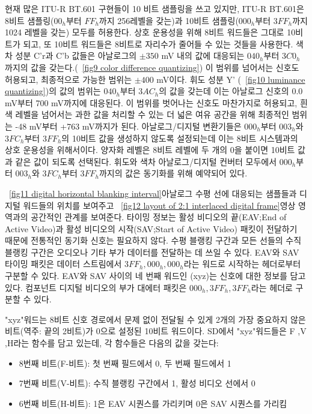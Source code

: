 현재 많은 ITU-R BT.601 구현들이 10 비트 샘플링을 쓰고 있지만, ITU-R BT.601은 8비트 샘플링($00_h$부터 $FF_h$까지 256레벨을 갖는)과 10비트 샘플링($000_h$부터 $3FF_h$까지 1024 레벨을 갖는) 모두를 허용한다.
상호 운용성을 위해 8비트 워드들은 그대로 10비트가 되고, 또 10비트 워드들은 8비트로 자리수가 줄어들 수 있는 것들을 사용한다. 색차 성분 C'r과 C'b 값들은 아날로그의 $\pm 350$ mV 내의 값에 대응되는 $040_h$부터 $3C0_h$까지의 값을 갖는다.(\figurename~\ref{fig9 color difference quantizing})
이 범위를 넘어서는 신호도 허용되고, 최종적으로 가능한 범위는 $\pm 400$ mV이다. 휘도 성분 Y' (\figurename~\ref{fig10 luminance quantizing})의 값의 범위는 $040_h$부터 $3AC_h$의 값을 갖는데 이는 아날로그 신호의 0.0 mV부터 700 mV까지에 대응된다.
이 범위를 벗어나는 신호도 마찬가지로 허용되고, 흰색 레벨을 넘어서는 과한 값을 처리할 수 있는 더 넓은 여유 공간을 위해 최종적인 범위는 -48 mV부터 +763 mV까지가 된다.
아날로그/디지털 변환기들은 $000_h$부터 $003_h$와 $3FC_h$부터 $3FF_h$의 10비트 값을 생성하지 않도록 설정되는데 이는 8비트 시스템과의 상호 운용성을 위해서이다.
양자화 레벨은 8비트 레벨에 두 개의 0을 붙이면 10비트 값과 같은 값이 되도록 선택된다. 휘도와 색차 아날로그/디지털 컨버터 모두에서 $000_h$부터 $003_h$와 $3FC_h$부터 $3FF_h$까지의 값은 동기화를 위해 예약되어 있다.


\figurename~\ref{fig11 digital horizontal blanking interval}\은 아날로그 수평 선에 대응되는 샘플들과 디지털 워드들의 위치를 보여주고 \figurename~\ref{fig12 layout of 2:1 interlaced digital frame}\은 영상 영역과의 공간적인 관계를 보여준다.
타이밍 정보는 활성 비디오의 끝(EAV;End of Active Video)과 활성 비디오의 시작(SAV;Start of Active Video) 패킷이 전달하기 때문에 전통적인 동기화 신호는 필요하지 않다.
수평 블랭킹 구간과 모든 선들의 수직 블랭킹 구간은 오디오나 기타 부가 데이터를 전달하는 데 쓰일 수 있다. EAV와 SAV 타이밍 패킷은 데이터 스트림에서 $3FF_h, 000_h, 000_h$라는 워드로 시작하는 헤더로부터 구분할 수 있다.
EAV와 SAV 사이의 네 번째 워드인 (xyz)는 신호에 대한 정보를 담고 있다. 컴포넌트 디지털 비디오의 부가 대에터 패킷은 $000_h, 3FF_h, 3FF_h$라는 헤더로 구분할 수 있다.

"xyz"워드는 8비트 신호 경로에서 문제 없이 전달될 수 있게 2개의 가장 중요하지 않은 비트(역주: 끝의 2비트)가 0으로 설정된 10비트 워드이다.
SD에서 "xyz"워드들은 F ,V ,H라는 함수를 담고 있는데, 각 함수들은 다음의 값을 갖는다:
\begin{itemize}
    \item 8번째 비트(F-비트): 첫 번째 필드에서 0, 두 번째 필드에서 1
    \item 7번째 비트(V-비트): 수직 블랭킹 구간에서 1, 활성 비디오 선에서 0
    \item 6번째 비트(H-비트): 1은 EAV 시퀀스를 가리키며 0은 SAV 시퀀스를 가리킴
\end{itemize}

